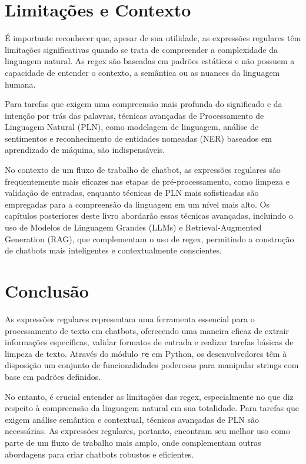 \documentclass[14pt,a4paper,oneside]{book}
\begin{document}
\section{Limitações e Contexto}
É importante reconhecer que, apesar de sua utilidade, as expressões regulares têm limitações significativas quando se trata de compreender a complexidade da linguagem natural. As regex são baseadas em padrões estáticos e não possuem a capacidade de entender o contexto, a semântica ou as nuances da linguagem humana.

Para tarefas que exigem uma compreensão mais profunda do significado e da intenção por trás das palavras, técnicas avançadas de Processamento de Linguagem Natural (PLN), como modelagem de linguagem, análise de sentimentos e reconhecimento de entidades nomeadas (NER) baseados em aprendizado de máquina, são indispensáveis.

No contexto de um fluxo de trabalho de chatbot, as expressões regulares são frequentemente mais eficazes nas etapas de pré-processamento, como limpeza e validação de entradas, enquanto técnicas de PLN mais sofisticadas são empregadas para a compreensão da linguagem em um nível mais alto. Os capítulos posteriores deste livro abordarão essas técnicas avançadas, incluindo o uso de Modelos de Linguagem Grandes (LLMs) e Retrieval-Augmented Generation (RAG), que complementam o uso de regex, permitindo a construção de chatbots mais inteligentes e contextualmente conscientes.

\section{Conclusão}
As expressões regulares representam uma ferramenta essencial para o processamento de texto em chatbots, oferecendo uma maneira eficaz de extrair informações específicas, validar formatos de entrada e realizar tarefas básicas de limpeza de texto. Através do módulo \texttt{re} em Python, os desenvolvedores têm à disposição um conjunto de funcionalidades poderosas para manipular strings com base em padrões definidos.

No entanto, é crucial entender as limitações das regex, especialmente no que diz respeito à compreensão da linguagem natural em sua totalidade. Para tarefas que exigem análise semântica e contextual, técnicas avançadas de PLN são necessárias. As expressões regulares, portanto, encontram seu melhor uso como parte de um fluxo de trabalho mais amplo, onde complementam outras abordagens para criar chatbots robustos e eficientes.
\end{document}
